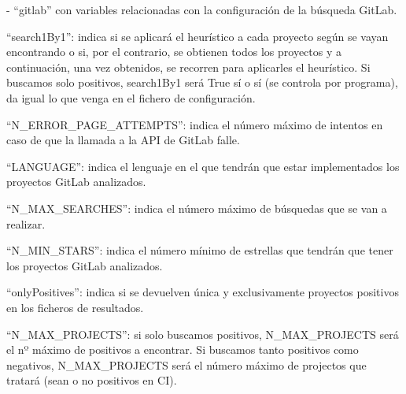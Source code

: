 - ``gitlab'' con variables relacionadas con la configuración de la búsqueda GitLab.
\begin{compactitem}
    \item ``search1By1'': indica si se aplicará el heurístico a cada proyecto según se vayan encontrando o si, por el contrario, se obtienen todos los proyectos y a continuación, una vez obtenidos, se recorren para aplicarles el heurístico. Si buscamos solo positivos, search1By1 será True sí o sí (se controla por programa), da igual lo que venga en el fichero de configuración.
    \item ``N\_ERROR\_PAGE\_ATTEMPTS'': indica el número máximo de intentos en caso de que la llamada a la API de GitLab falle.
    \item ``LANGUAGE'': indica el lenguaje en el que tendrán que estar implementados los proyectos GitLab analizados.
    \item ``N\_MAX\_SEARCHES'': indica el número máximo de búsquedas que se van a realizar.
    \item ``N\_MIN\_STARS'': indica el número mínimo de estrellas que tendrán que tener los proyectos GitLab analizados.
    \item ``onlyPositives'': indica si se devuelven única y exclusivamente proyectos positivos en los ficheros de resultados.
    \item ``N\_MAX\_PROJECTS'': si solo buscamos positivos, N\_MAX\_PROJECTS será el nº máximo de positivos a encontrar. Si buscamos tanto positivos como negativos, N\_MAX\_PROJECTS será el número máximo de projectos que tratará (sean o no positivos en CI).
\end{compactitem}

